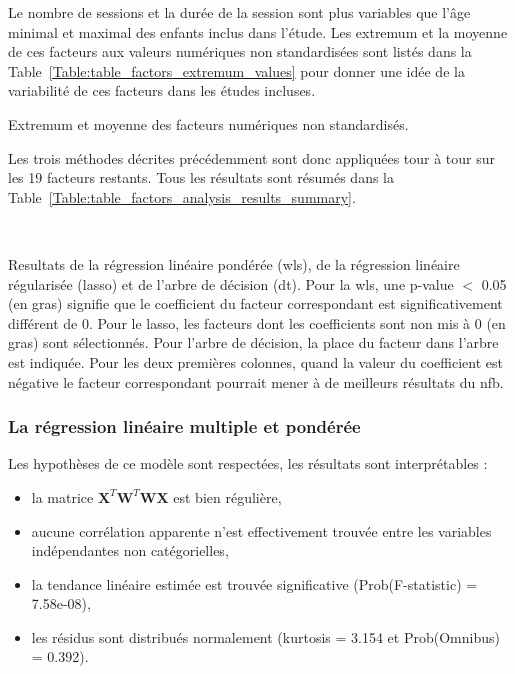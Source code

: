 Le nombre de sessions et la durée de la session sont plus variables que l'âge minimal et maximal des enfants inclus dans l'étude. Les extremum et la moyenne de ces facteurs aux valeurs numériques
non standardisées sont listés dans la Table~\ref{Table:table_factors_extremum_values} pour donner une idée de la variabilité de ces facteurs dans les études incluses. 

\begin{table}[h!]
  \centering
  \caption{Extremum et moyenne des facteurs numériques non standardisés.}
  
  \label{Table:table_factors_extremum_values}
\end{table}

Les trois méthodes décrites précédemment sont donc appliquées tour à tour sur les 19 facteurs restants. Tous les résultats sont résumés dans la Table~\ref{Table:table_factors_analysis_results_summary}.

\newpage\
\begin{table}[h!]
  \centering
  \caption{Resultats de la régression linéaire pondérée (\gls{wls}), de la régression linéaire régularisée (\gls{lasso}) et de l'arbre de décision (\gls{dt}). Pour la \gls{wls}, une p-value $<$ 0.05 
	(en gras) signifie que le coefficient du facteur correspondant est significativement différent de 0. Pour le \gls{lasso}, les facteurs dont les coefficients sont non mis à 0 (en gras) sont 
	sélectionnés. Pour l'arbre de décision, la place du facteur dans l'arbre est indiquée. Pour les deux premières colonnes, quand la valeur du coefficient est négative le facteur 
	correspondant pourrait mener à de meilleurs résultats du \gls{nfb}.}
  
  \label{Table:table_factors_analysis_results_summary}
\end{table}

\subsubsection{La régression linéaire multiple et pondérée}

Les hypothèses de ce modèle sont respectées, les résultats sont interprétables :
\begin{itemize}
	\item la matrice ${\textbf{X}}^{T}\textbf{W}^{T}\textbf{WX}$ est bien régulière,
  \item aucune corrélation apparente n'est effectivement trouvée entre les variables indépendantes non catégorielles, 
  \item la tendance linéaire estimée est trouvée significative (Prob(F-statistic) = 7.58e-08),
  \item les résidus sont distribués normalement (kurtosis = 3.154 et Prob(Omnibus) = 0.392).
\end{itemize}

